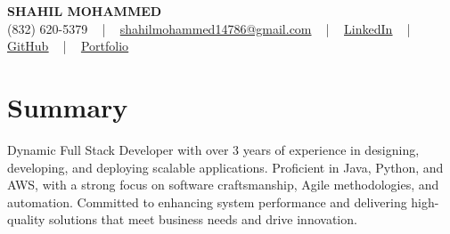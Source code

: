 \documentclass[letterpaper,10pt]{article}
\begin{document}
\begin{center}
    {\fontsize{14pt}{12pt}\selectfont \textbf{\MakeUppercase{Shahil Mohammed}}}\\ \vspace{2pt}
    \fontsize{10pt}{12pt}\selectfont (832) 620-5379 ~ | ~ \href{mailto:shahilmohammed14786@gmail.com}{shahilmohammed14786@gmail.com} ~ | ~  
    \href{https://www.linkedin.com/in/shahil-mohammed-9652931a1/}{\color{blue}\underline{LinkedIn}}  ~ | ~ 
    \href{https://github.com/freakbeast14}{\color{blue}\underline{GitHub}} ~ | ~ 
    \href{https://shahil-mohammed.netlify.app/}{\color{blue}\underline{Portfolio}}
    \vspace{-8pt}
\end{center}

\section{Summary}
\vspace{-2pt}\fontsize{8pt}{9pt}\selectfont
Dynamic Full Stack Developer with over 3 years of experience in designing, developing, and deploying scalable applications. Proficient in Java, Python, and AWS, with a strong focus on software craftsmanship, Agile methodologies, and automation. Committed to enhancing system performance and delivering high-quality solutions that meet business needs and drive innovation.
 \vspace{-5pt}
 
\vspace{-2pt}
\end{document}
